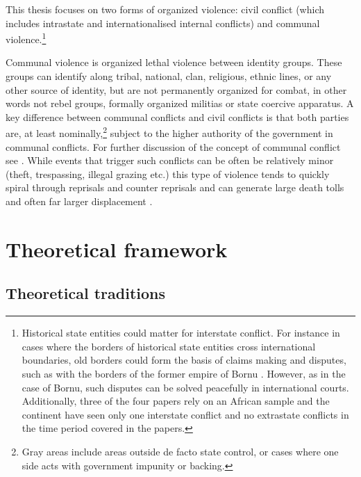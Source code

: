This thesis focuses on two forms of organized violence: civil conflict (which
includes intrastate and internationalised internal conflicts) and communal
violence.\footnote{Historical state entities could matter for interstate
	conflict. For instance in cases where the borders of historical state
	entities cross international boundaries, old borders could form the
	basis of claims making and disputes, such as with the borders of the
	former empire of Bornu \citep{Hariri2012}. However, as in the case of
	Bornu, such disputes can be solved peacefully in international courts.
	Additionally, three of the four papers rely on an African sample and the
	continent have seen only one interstate conflict and no extrastate
conflicts in the time period covered in the papers.} 

Communal violence is organized lethal violence between identity groups. These
groups can identify along tribal, national, clan, religious, ethnic lines, or
any other source of identity, but are not permanently organized for combat, in
other words not rebel groups, formally organized militias or state coercive
apparatus. A key difference between communal conflicts and civil conflicts is
that both parties are, at least nominally,\footnote{Gray areas include areas
	outside de facto state control, or cases where one side acts with
government impunity or backing.} subject to the higher authority of the
government in communal conflicts. For further discussion of the concept of
communal conflict see \citet{BroscheJohan2012Cccw}. While events that trigger
such conflicts can be often be relatively minor (theft, trespassing, illegal
grazing etc.) this type of violence tends to quickly spiral through reprisals
and counter reprisals and can generate large death tolls and often far larger
displacement \citep{Horowitz_2001}. 

\section{Theoretical framework}
\label{Theoretical framework}

\subsection{Theoretical traditions} \label{traditions}

